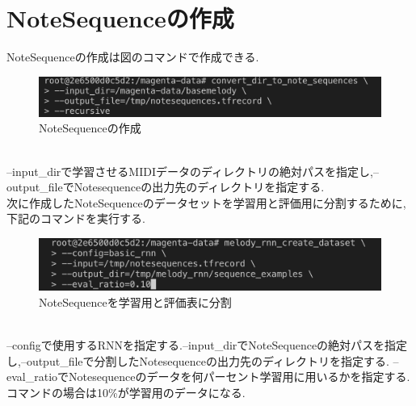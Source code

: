 \section{NoteSequenceの作成}
NoteSequenceの作成は図のコマンドで作成できる.
\begin{figure}[!ht]
    \begin{screen}
    \begin{center}
        \includegraphics[scale=0.7, clip]{./img/Notesequence_make.png}
        \caption{NoteSequenceの作成}
        \label{fig:NoteSequenceの作成}
    \end{center}
    \end{screen}
\end{figure}\\
--input\_dirで学習させるMIDIデータのディレクトリの絶対パスを指定し,--output\_fileでNotesequenceの出力先のディレクトリを指定する.\\
次に作成したNoteSequenceのデータセットを学習用と評価用に分割するために,下記のコマンドを実行する.
\begin{figure}[!ht]
    \begin{screen}
    \begin{center}
        \includegraphics[scale=0.7, clip]{./img/Notesequence_split.png}
        \caption{NoteSequenceを学習用と評価表に分割}
        \label{fig:NoteSequenceを学習用と評価表に分割}
    \end{center}
    \end{screen}
\end{figure}\\
--configで使用するRNNを指定する.--input\_dirでNoteSequenceの絶対パスを指定し,--output\_fileで分割したNotesequenceの出力先のディレクトリを指定する.
--eval\_ratioでNotesequenceのデータを何パーセント学習用に用いるかを指定する.コマンドの場合は10\%が学習用のデータになる.
